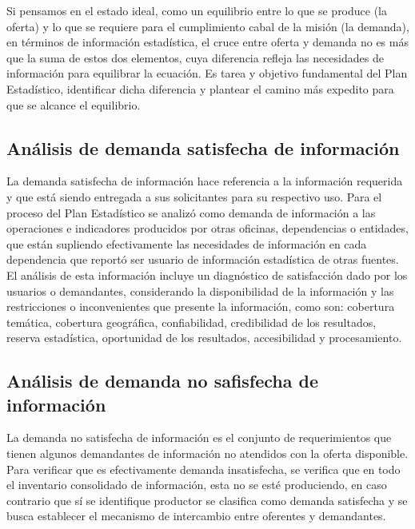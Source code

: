 \documentclass[
]{book}
\begin{document}
Si pensamos en el estado ideal, como un equilibrio entre lo que se produce (la oferta) y lo que se
requiere para el cumplimiento cabal de la misión (la demanda), en términos de información
estadística, el cruce entre oferta y demanda no es más que la suma de estos dos elementos, cuya
diferencia refleja las necesidades de información para equilibrar la ecuación. Es tarea y objetivo
fundamental del Plan Estadístico, identificar dicha diferencia y plantear el camino más expedito
para que se alcance el equilibrio.

\hypertarget{anuxe1lisis-de-demanda-satisfecha-de-informaciuxf3n}{%
\subsection{Análisis de demanda satisfecha de información}\label{anuxe1lisis-de-demanda-satisfecha-de-informaciuxf3n}}

La demanda satisfecha de información hace referencia a la información requerida y que está
siendo entregada a sus solicitantes para su respectivo uso. Para el proceso del Plan Estadístico se
analizó como demanda de información a las operaciones e indicadores producidos por otras
oficinas, dependencias o entidades, que están supliendo efectivamente las necesidades de
información en cada dependencia que reportó ser usuario de información estadística de otras
fuentes. El análisis de esta información incluye un diagnóstico de satisfacción dado por los
usuarios o demandantes, considerando la disponibilidad de la información y las restricciones o
inconvenientes que presente la información, como son: cobertura temática, cobertura geográfica, confiabilidad, credibilidad de los resultados, reserva estadística, oportunidad de los resultados,
accesibilidad y procesamiento.

\hypertarget{anuxe1lisis-de-demanda-no-safisfecha-de-informaciuxf3n}{%
\subsection{Análisis de demanda no safisfecha de información}\label{anuxe1lisis-de-demanda-no-safisfecha-de-informaciuxf3n}}

La demanda no satisfecha de información es el conjunto de requerimientos que tienen algunos
demandantes de información no atendidos con la oferta disponible. Para verificar que es
efectivamente demanda insatisfecha, se verifica que en todo el inventario consolidado de
información, esta no se esté produciendo, en caso contrario que sí se identifique productor se
clasifica como demanda satisfecha y se busca establecer el mecanismo de intercambio entre
oferentes y demandantes.
\end{document}
